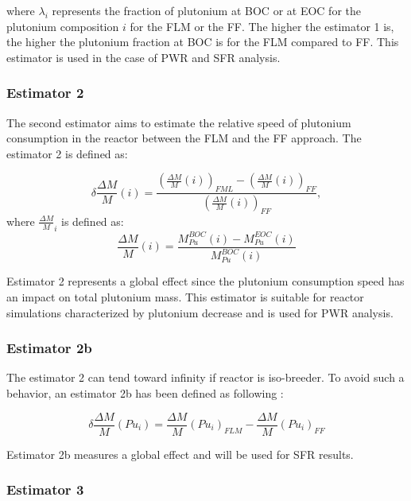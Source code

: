 where $\lambda_i$ represents the fraction of plutonium at \gls{BOC} or at
\gls{EOC} for the plutonium composition $i$ for the \gls{FLM} or the \gls{FF}.
The higher the estimator 1 is, the higher the plutonium fraction at \gls{BOC} is
for the \gls{FLM} compared to \gls{FF}. This estimator is used in the case of
\gls{PWR} and \gls{SFR} analysis.

\subsubsection{Estimator 2}

The second estimator aims to estimate the relative speed of plutonium
consumption in the reactor between the \gls{FLM} and the \gls{FF} approach. The
estimator 2 is defined as:

\begin{equation}
    \delta{\frac{\Delta M}{M}}(i) =
        \frac{\left(\frac{\Delta M}{M}(i)\right)_{FML}
              - \left(\frac{\Delta M}{M}(i)\right)_{FF}}
             {\left(\frac{\Delta M}{M}(i)\right)_{FF}},
\end{equation}
where $\frac{\Delta M}{M}_{i}$ is defined as:
\begin{equation}
    \frac{\Delta M}{M}(i) = \frac{M_{Pu}^{BOC}(i) -
    M_{Pu}^{EOC}(i)}{M_{Pu}^{BOC}(i)}
\end{equation}

Estimator 2 represents a global effect since the plutonium consumption speed has
an impact on total plutonium mass. This estimator is suitable for reactor
simulations characterized by plutonium decrease and is used for \gls{PWR} analysis.

\subsubsection{Estimator 2b}

The estimator 2 can tend toward infinity if reactor is iso-breeder. To avoid
such a behavior, an estimator 2b has been defined as following : 

\begin{equation}
    \delta \frac{\Delta M}{M}(Pu_i) = \frac{\Delta M}{M}(Pu_i)_{FLM} - \frac{\Delta M}{M}(Pu_i)_{FF}
\end{equation}

Estimator 2b measures a global effect and will be used for \gls{SFR} results.

\subsubsection{Estimator 3}

